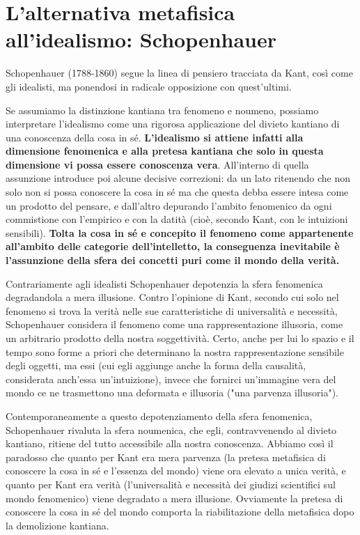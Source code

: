 \section{L'alternativa metafisica all'idealismo: Schopenhauer}

Schopenhauer (1788-1860) segue la linea di pensiero tracciata da Kant, così come gli idealisti, ma ponendosi in radicale opposizione con quest'ultimi.

Se assumiamo la distinzione kantiana tra fenomeno e noumeno, possiamo interpretare l'idealismo come una rigorosa applicazione del divieto kantiano di una conoscenza della cosa in sé. \textbf{L'idealismo si attiene infatti alla dimensione fenomenica e alla pretesa kantiana che solo in questa dimensione vi possa essere conoscenza vera}. All’interno di quella assunzione introduce poi alcune decisive correzioni: da un lato ritenendo che non solo non si possa conoscere la cosa in sé ma che questa debba essere intesa come un prodotto del pensare, e dall’altro depurando l’ambito fenomenico da ogni commistione con l’empirico e con la datità (cioè, secondo Kant, con le intuizioni sensibili). \textbf{Tolta la cosa in sé e concepito il fenomeno come appartenente all’ambito delle categorie dell’intelletto, la conseguenza inevitabile è l’assunzione della sfera dei concetti puri come il mondo della verità.}

Contrariamente agli idealisti Schopenhauer depotenzia la sfera fenomenica degradandola a mera illusione. Contro l’opinione di Kant, secondo cui solo nel fenomeno si trova la verità nelle sue caratteristiche di universalità e necessità, Schopenhauer considera il fenomeno come una rappresentazione illusoria, come un arbitrario prodotto della nostra soggettività. Certo, anche per lui lo spazio e il tempo sono forme a priori che determinano la nostra rappresentazione sensibile degli oggetti, ma essi (cui egli aggiunge anche la forma della causalità, considerata anch’essa un’intuizione), invece che fornirci un’immagine vera del mondo ce ne trasmettono una deformata e illusoria ("una parvenza illusoria").

Contemporaneamente a questo depotenziamento della sfera fenomenica, Schopenhauer rivaluta la sfera noumenica, che egli, contravvenendo al divieto kantiano, ritiene del tutto accessibile alla nostra conoscenza. Abbiamo così il paradosso che quanto per Kant era mera parvenza (la pretesa metafisica di conoscere la cosa in sé e l’essenza del mondo) viene ora elevato a unica verità, e quanto per Kant era verità (l’universalità e necessità dei giudizi scientifici sul mondo fenomenico) viene degradato a mera illusione. Ovviamente la pretesa di conoscere la cosa in sé del mondo comporta la riabilitazione della metafisica dopo la demolizione kantiana. 

